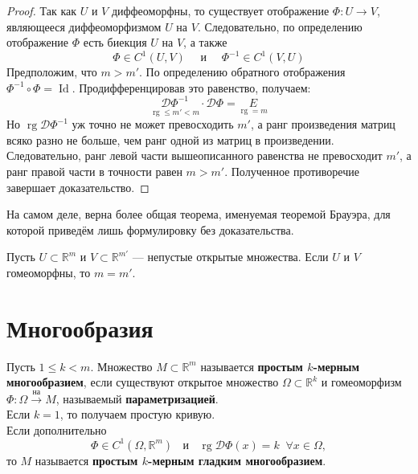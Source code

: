 \documentclass[11pt]{article}
\DeclareMathOperator{\rg}{rg}
\DeclareMathOperator{\Id}{Id}
\begin{document}
\begin{proof}
    Так как $U$ и $V$ диффеоморфны, то существует отображение $\Phi \colon U \to V$, являющееся диффеоморфизмом $U$ на $V$. Следовательно, по определению отображение $\Phi$ есть биекция $U$ на $V$, а также 
    \[\Phi \in C^{1} (U, V) \quad \text{ и } \quad \Phi^{-1} \in C^{1} (V, U) \]
    Предположим, что $m > m'$. По определению обратного отображения $\Phi^{-1} \circ \Phi = \Id$. Продифференцировав это равенство, получаем:
    \[\underset{\rg \leq m' < m}{\mathcal{D}\Phi^{-1}} \cdot \mathcal{D}\Phi = \underset{\rg = m}{E}\]
    Но $\rg \mathcal{D} \Phi^{-1}$ уж точно не может превосходить $m'$, а ранг произведения матриц всяко разно не больше, чем ранг одной из матриц в произведении. Следовательно, ранг левой части вышеописанного равенства не превосходит $m'$, а ранг правой части в точности равен $m > m'$. Полученное противоречие завершает доказательство.
\end{proof}

\begin{remark}
    На самом деле, верна более общая теорема, именуемая теоремой Брауэра, для которой приведём лишь формулировку без доказательства.
\end{remark}

\begin{theorem}[Брауэра]
    Пусть $U \subset \mathbb{R}^m$ и $V \subset \mathbb{R}^{m'}$ --- непустые открытые множества. Если $U$ и $V$ гомеоморфны, то $m = m'$.
\end{theorem}

\section{Многообразия}

\begin{definition}
    Пусть $1 \leq k < m$. Множество $M \subset \mathbb{R}^m$ называется \textbf{простым
    $k$-мерным многообразием}, если существуют открытое множество $\Omega \subset \mathbb{R}^k$ и гомеоморфизм $\Phi \colon \Omega \overset{\text{на}}{\to} M$, называемый \textbf{параметризацией}.\\
    Если $k = 1$, то получаем простую кривую. \\ 
    Если дополнительно 
    \[\Phi \in C^1(\Omega, \mathbb{R}^m) \; \; \text{ и } \; \; \rg \mathcal{D}\Phi(x) = k \; \; \forall x \in \Omega,\] 
    то $M$ называется \textbf{простым $k$-мерным гладким многообразием}.
\end{definition}
\end{document}
